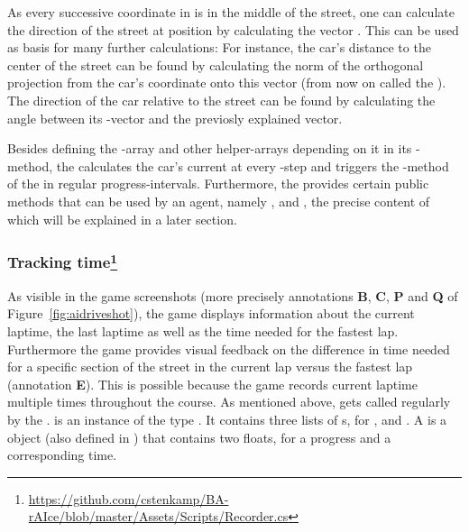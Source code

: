 As every successive coordinate in  is in the middle of the street, one can calculate the direction of the street at position  by calculating the vector . This can be used as basis for many further calculations: For instance, the car's distance to the center of the street can be found by calculating the norm of the orthogonal projection from the car's coordinate onto this vector (from now on called the ). The direction of the car relative to the street can be found by calculating the angle between its -vector and the previosly explained vector.

Besides defining the -array and other helper-arrays depending on it in its -method, the  calculates the car's current  at every -step and triggers the -method of the  in regular progress-intervals. Furthermore, the  provides certain public methods that can be used by an agent, namely ,  and , the precise content of which will be explained in a later section.

\subsubsection{Tracking time\footnote{\url{https://github.com/cstenkamp/BA-rAIce/blob/master/Assets/Scripts/Recorder.cs}}}

As visible in the game screenshots (more precisely annotations \textbf{B}, \textbf{C}, \textbf{P} and \textbf{Q} of Figure~\ref{fig:aidriveshot}), the game displays information about the current laptime, the last laptime as well as the time needed for the fastest lap. Furthermore the game provides visual feedback on the difference in time needed for a specific section of the street in the current lap versus the fastest lap (annotation \textbf{E}). This is possible because the game records current laptime multiple times throughout the course. As mentioned above,  gets called regularly by the .  is an instance of the type . It contains three lists of s, for ,  and . A  is a  object (also defined in ) that contains two floats, for a progress and a corresponding time.

